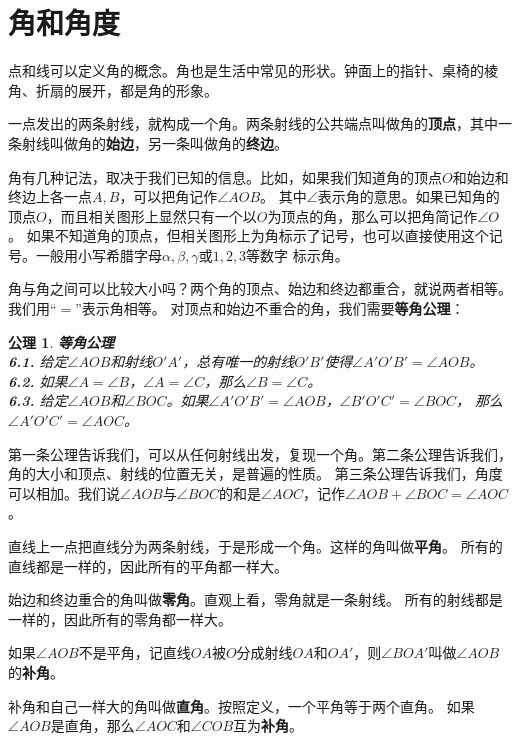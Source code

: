 \documentclass[12pt,UTF8]{ctexbook}
\newtheorem{po}{公理}
\begin{document}
\section{角和角度}
点和线可以定义角的概念。角也是生活中常见的形状。钟面上的指针、桌椅的棱角、折扇的展开，都是角的形象。

一点发出的两条射线，就构成一个角。两条射线的公共端点叫做角的\textbf{顶点}，其中一条射线叫做角的\textbf{始边}，另一条叫做角的\textbf{终边}。

角有几种记法，取决于我们已知的信息。比如，如果我们知道角的顶点$O$和始边和终边上各一点$A,B$，可以把角记作$\angle AOB$。
其中$\angle$表示角的意思。如果已知角的顶点$O$，而且相关图形上显然只有一个以$O$为顶点的角，那么可以把角简记作$\angle O$。
如果不知道角的顶点，但相关图形上为角标示了记号，也可以直接使用这个记号。一般用小写希腊字母$\alpha, \beta, \gamma$或$1,2,3$等数字
标示角。

角与角之间可以比较大小吗？两个角的顶点、始边和终边都重合，就说两者相等。我们用“$=$”表示角相等。
对顶点和始边不重合的角，我们需要\textbf{等角公理}：
\begin{po}{\textbf{等角公理}}\label{po:5}
    \mbox{}\\
    \indent \textbf{6.1.} 给定$\angle AOB$和射线$O'A'$，总有唯一的射线$O'B'$使得$\angle A'O'B' = \angle AOB$。\\
    \indent \textbf{6.2.} 如果$\angle A = \angle B$，$\angle A = \angle C$，那么$\angle B = \angle C$。\\
    \indent \textbf{6.3.} 给定$\angle AOB$和$\angle BOC$。如果$\angle A'O'B' = \angle AOB$，$\angle B'O'C' = \angle BOC$，
    那么$\angle A'O'C' = \angle AOC$。
\end{po}
第一条公理告诉我们，可以从任何射线出发，复现一个角。第二条公理告诉我们，角的大小和顶点、射线的位置无关，是普遍的性质。
第三条公理告诉我们，角度可以相加。我们说$\angle AOB$与$\angle BOC$的和是$\angle AOC$，记作$\angle AOB + \angle BOC = \angle AOC$。

直线上一点把直线分为两条射线，于是形成一个角。这样的角叫做\textbf{平角}。
所有的直线都是一样的，因此所有的平角都一样大。

始边和终边重合的角叫做\textbf{零角}。直观上看，零角就是一条射线。
所有的射线都是一样的，因此所有的零角都一样大。

如果$\angle AOB$不是平角，记直线$OA$被$O$分成射线$OA$和$OA'$，则$\angle BOA'$叫做$\angle AOB$的\textbf{补角}。

补角和自己一样大的角叫做\textbf{直角}。按照定义，一个平角等于两个直角。
如果$\angle AOB$是直角，那么$\angle AOC$和$\angle COB$互为\textbf{补角}。
\end{document}
